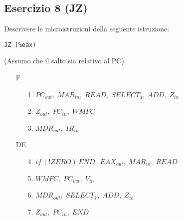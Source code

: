 \documentclass[a4paper]{article}
\theoremstyle{break}
\theoremstyle{break}
\theoremstyle{break}
\theoremstyle{break}
\begin{document}
\subsection{Esercizio 8 (JZ)}
\begin{exercise}
  Descrivere le microistruzioni della seguente istruzione:
  \begin{center}
    \texttt{JZ (\%eax)}
  \end{center}
  (Assumo che il salto sia relativo al PC)
  \begin{enumerate}
    \item [F]
      \begin{enumerate}
        \item [1.] \( PC_{out},\; MAR_{in},\; READ,\; SELECT_4,\; ADD,\; Z_{in} \) 
        \item [2.] \( Z_{out},\; PC_{in},\; WMFC \) 
        \item [3.] \( MDR_{out},\; IR_{in} \) 
      \end{enumerate}
    \item [DE]
      \begin{enumerate}
        \item [4.] \( if\,(!ZERO)\,END,\; EAX_{out},\; MAR_{in},\; READ \) 
        \item [5.] \( WMFC,\; PC_{out},\; V_{in} \) 
        \item [6.] \( MDR_{out},\; SELECT_V,\; ADD,\; Z_{in} \) 
        \item [7.] \( Z_{out},\; PC_{in},\; END \) 
      \end{enumerate}
  \end{enumerate}
\end{exercise}
\end{document}
